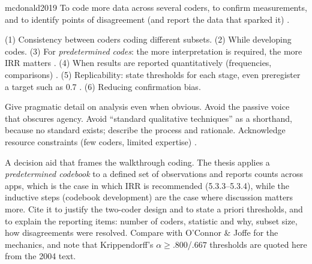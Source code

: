 \begin{papercard}{mcdonald2019}
 To code more data across several coders, to confirm measurements, and to identify points of disagreement (and report the data that sparked it) .

 (1) Consistency between coders coding different subsets. (2) While developing codes. (3) For \emph{predetermined codes}: the more interpretation is required, the more IRR matters . (4) When results are reported quantitatively (frequencies, comparisons) . (5) Replicability: state thresholds for each stage, even preregister a target such as 0.7 . (6) Reducing confirmation bias.

 Give pragmatic detail on analysis even when obvious. Avoid the passive voice that obscures agency. Avoid ``standard qualitative techniques'' as a shorthand, because no standard exists; describe the process and rationale. Acknowledge resource constraints (few coders, limited expertise) .

 A decision aid that frames the walkthrough coding. The thesis applies a \emph{predetermined codebook} to a defined set of observations and reports counts across apps, which is the case in which IRR is recommended (5.3.3--5.3.4), while the inductive steps (codebook development) are the case where discussion matters more. Cite it to justify the two-coder design and to state a priori thresholds, and to explain the reporting items: number of coders, statistic and why, subset size, how disagreements were resolved. Compare with O'Connor \& Joffe for the mechanics, and note that Krippendorff's $\alpha\ge.800$/$.667$ thresholds are quoted here from the 2004 text.
\end{papercard}
